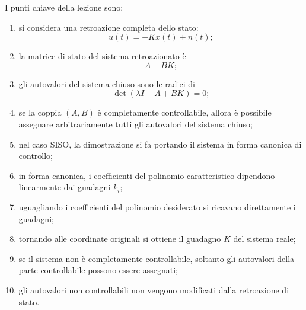 I punti chiave della lezione sono:
\begin{enumerate}
    \item si considera una retroazione completa dello stato:
    \[
    u(t)=-Kx(t)+n(t);
    \]
    \item la matrice di stato del sistema retroazionato è
    \[
    A-BK;
    \]
    \item gli autovalori del sistema chiuso sono le radici di
    \[
    \det(\lambda I-A+BK)=0;
    \]
    \item se la coppia \((A,B)\) è completamente controllabile, allora è possibile assegnare arbitrariamente tutti gli autovalori del sistema chiuso;
    \item nel caso SISO, la dimostrazione si fa portando il sistema in forma canonica di controllo;
    \item in forma canonica, i coefficienti del polinomio caratteristico dipendono linearmente dai guadagni \(k_i\);
    \item uguagliando i coefficienti del polinomio desiderato si ricavano direttamente i guadagni;
    \item tornando alle coordinate originali si ottiene il guadagno \(K\) del sistema reale;
    \item se il sistema non è completamente controllabile, soltanto gli autovalori della parte controllabile possono essere assegnati;
    \item gli autovalori non controllabili non vengono modificati dalla retroazione di stato.
\end{enumerate}